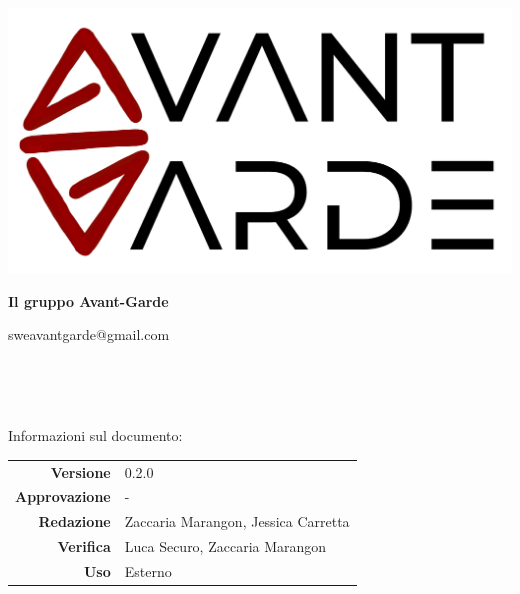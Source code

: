     \begin{titlepage}
        \begin{center}
            \includegraphics[width=\textwidth]{logo+scritta.png}

            \vspace{0.5cm}
            {\huge \textbf{Il gruppo Avant-Garde}}

            \vspace{0.4cm}
            \large{sweavantgarde@gmail.com}

            \vspace{1.5cm}
            \hrulefill\\
            \vspace{0.2cm}
            
            \textbf{\titoloDocumento}\\
           
            \hrulefill

            \vfill
            Informazioni sul documento:\\
            \vspace{0.3cm}
                \begin{tabular}{ r | l }
                    \textbf{Versione} & 0.2.0\\ %
                    \textbf{Approvazione} & -\\ %
                    \textbf{Redazione} & Zaccaria Marangon, Jessica Carretta\\ %
                    \textbf{Verifica} & Luca Securo, Zaccaria Marangon\\ %
                    \textbf{Uso} & Esterno\\ %
                \end{tabular}
        \end{center}
    \end{titlepage}
\restoregeometry